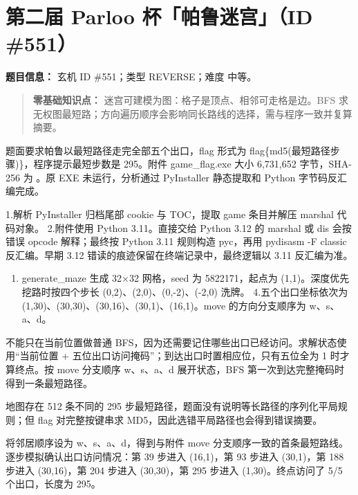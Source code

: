 \section{第二届 Parloo 杯「帕鲁迷宫」（ID \#551）}\label{ux7b2cux4e8cux5c4a-parloo-ux676fux5e15ux9c81ux8ff7ux5babid-551}

\textbf{题目信息：} 玄机 ID \#551；类型 REVERSE；难度 中等。

\begin{quote}
\textbf{零基础知识点：} 迷宫可建模为图：格子是顶点、相邻可走格是边。BFS 求无权图最短路；方向遍历顺序会影响同长路线的选择，需与程序一致并复算摘要。
\end{quote}

题面要求帕鲁以最短路径走完全部五个出口，flag 形式为 flag\{md5(最短路径步骤)\}，程序提示最短步数是 295。附件 game\_flag.exe 大小 6,731,652 字节，SHA-256 为 。原 EXE 未运行，分析通过 PyInstaller 静态提取和 Python 字节码反汇编完成。

1.解析 PyInstaller 归档尾部 cookie 与 TOC，提取 game 条目并解压 marshal 代码对象。 2.附件使用 Python 3.11。直接交给 Python 3.12 的 marshal 或 dis 会按错误 opcode 解释；最终按 Python 3.11 规则构造 pyc，再用 pydisasm -F classic 反汇编。早期 3.12 错读的痕迹保留在终端记录中，最终逻辑以 3.11 反汇编为准。

\begin{enumerate}
\def\labelenumi{\arabic{enumi}.}
\setcounter{enumi}{2}
\tightlist
\item
  generate\_maze 生成 32×32 网格，seed 为 5822171，起点为 (1,1)。深度优先挖路时按四个步长 (0,2)、(2,0)、(0,-2)、(-2,0) 洗牌。 4.五个出口坐标依次为 (1,30)、(30,30)、(30,16)、(30,1)、(16,1)。move 的方向分支顺序为 w、s、a、d。
\end{enumerate}

不能只在当前位置做普通 BFS，因为还需要记住哪些出口已经访问。求解状态使用``当前位置 + 五位出口访问掩码''；到达出口时置相应位，只有五位全为 1 时才算终点。按 move 分支顺序 w、s、a、d 展开状态，BFS 第一次到达完整掩码时得到一条最短路径。

地图存在 512 条不同的 295 步最短路径，题面没有说明等长路径的序列化平局规则；但 flag 对完整按键串求 MD5，因此选错平局路径也会得到错误摘要。

将邻居顺序设为 w、s、a、d，得到与附件 move 分支顺序一致的首条最短路线。逐步模拟确认出口访问情况：第 39 步进入 (16,1)，第 93 步进入 (30,1)，第 188 步进入 (30,16)，第 204 步进入 (30,30)，第 295 步进入 (1,30)。终点访问了 5/5 个出口，长度为 295。

